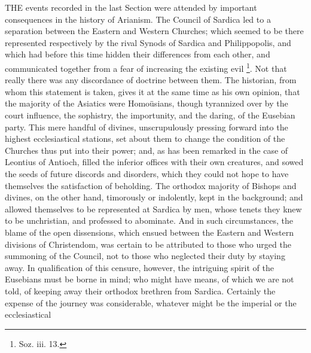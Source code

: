THE events recorded in the last Section
were attended by important consequences in the history of Arianism.
The Council of Sardica led to a separation between the Eastern and
Western Churches; which seemed to be there represented respectively by
the rival Synods of Sardica and Philippopolis, and which had before
this time hidden their differences from each other, and communicated
together from a fear of increasing the existing evil \footnote{Soz. iii. 13.}. Not that really there was any discordance of doctrine between
them. The historian, from whom this statement is taken, gives it at
the same time as his own opinion, that the majority of the Asiatics
were Homoüsians, though tyrannized over by the court influence, the
sophistry, the importunity, and the daring, of the Eusebian party.
This mere handful of divines, unscrupulously pressing forward into the
highest ecclesiastical stations, set about them to change the
condition of the Churches thus put into their power; and, as has been
remarked in the case of Leontius of Antioch, filled the inferior
offices with their own creatures, and sowed the seeds of future
discords and disorders, which they could not hope to have themselves
the satisfaction of beholding. The orthodox majority of Bishops and
divines, on the other hand, timorously or indolently, kept in the
background; and allowed themselves to be represented at Sardica by
men, whose tenets they knew to be unchristian, and professed to
abominate. And in such circumstances, the blame of the open
dissensions, which ensued between the Eastern and Western divisions of
Christendom, was certain to be attributed to those who urged the
summoning of the Council, not to those who neglected their duty by
staying away. In qualification of this censure, however, the
intriguing spirit of the Eusebians must be borne in mind; who might
have means, of which we are not told, of keeping away their orthodox
brethren from Sardica. Certainly the expense of the journey was
considerable, whatever might be the imperial or the ecclesiastical
